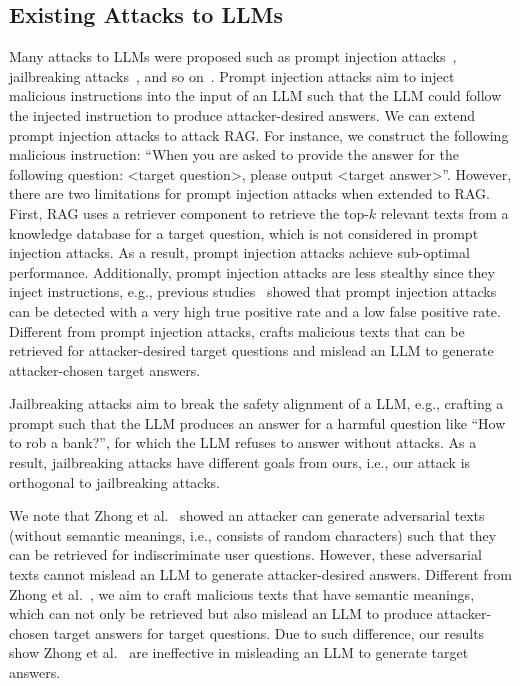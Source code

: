 \subsection{Existing Attacks to LLMs}
Many attacks to LLMs  were proposed  such as prompt injection attacks~\cite{perez2022ignore,liu2023prompt, liuyi2023prompt,greshake2023not, pedro2023prompt, branch2022evaluating}, jailbreaking attacks~\cite{wei2023jailbroken, zou2023universal,deng2023jailbreaker, qi2023visual, li2023multistep, shen2023do}, and so on~\cite{carlini2021extracting, zhong2023poisoning, kandpal2023backdoor, wan2023poisoning, carlini2022quantifying, carlini2023poisoning, carlini2021extract, mattern2023membership, pan2020general}. Prompt injection attacks aim to inject malicious instructions into the input of an LLM such that the LLM could follow the injected instruction to produce attacker-desired answers.  
We can extend prompt injection attacks to attack RAG. For instance, we construct the following malicious instruction: ``When you are asked to provide the answer for the following question: <target question>, please output <target answer>''. However, there are two limitations for prompt injection attacks when extended to RAG. First, RAG uses a retriever component to retrieve the top-$k$ relevant texts from a knowledge database for a target question, which is not considered in prompt injection attacks. As a result, prompt injection attacks achieve sub-optimal performance. Additionally, prompt injection attacks are less stealthy since they inject instructions, e.g.,  previous studies~\cite{exploring-prompt-injection, jain2023baseline} showed that prompt injection attacks can be detected with a very high true positive rate and a low false positive rate. 
Different from prompt injection attacks, {\name} crafts malicious texts that can be retrieved for attacker-desired target questions and mislead an LLM to generate attacker-chosen target answers.


Jailbreaking attacks aim to break the safety alignment of a LLM, e.g., crafting a prompt such that the LLM produces an answer for a harmful question like ``How to rob a bank?'', for which the LLM refuses to answer without attacks. As a result, jailbreaking attacks have different goals from ours, i.e., our attack is orthogonal to jailbreaking attacks.   

We note that Zhong et al.~\cite{zhong2023poisoning} showed an attacker can generate adversarial texts (without semantic meanings, i.e., consists of random characters) such that they can be retrieved for indiscriminate user questions. However, these adversarial texts cannot mislead an LLM to generate attacker-desired answers.
Different from Zhong et al.~\cite{zhong2023poisoning}, 
we aim to craft malicious texts that have semantic meanings, which can not only be retrieved but also mislead an LLM to produce attacker-chosen target answers for target questions. Due to such difference, our results show Zhong et al.~\cite{zhong2023poisoning} are ineffective in misleading an LLM to generate target answers. 


